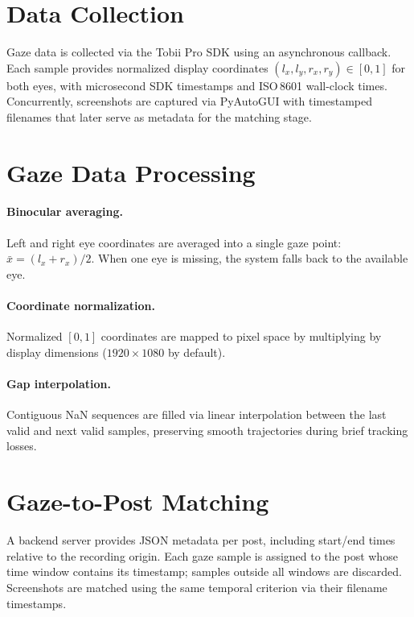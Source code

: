 \documentclass[11pt,a4paper]{article}
\begin{document}
\section{Data Collection}
\label{sec:collection}

Gaze data is collected via the Tobii Pro SDK using an asynchronous
callback. Each sample provides normalized display coordinates
$(l_x, l_y, r_x, r_y) \in [0,1]$ for both eyes, with microsecond SDK
timestamps and ISO\,8601 wall-clock times. Concurrently, screenshots are
captured via PyAutoGUI with timestamped filenames that later serve as
metadata for the matching stage.

\section{Gaze Data Processing}
\label{sec:processing}

\paragraph{Binocular averaging.}
Left and right eye coordinates are averaged into a single gaze point:
$\bar{x} = (l_x + r_x)/2$. When one eye is missing, the system falls
back to the available eye.

\paragraph{Coordinate normalization.}
Normalized $[0,1]$ coordinates are mapped to pixel space by multiplying
by display dimensions ($1920 \times 1080$ by default).

\paragraph{Gap interpolation.}
Contiguous NaN sequences are filled via linear interpolation between
the last valid and next valid samples, preserving smooth trajectories
during brief tracking losses.

\section{Gaze-to-Post Matching}
\label{sec:matching}

A backend server provides JSON metadata per post, including start/end
times relative to the recording origin. Each gaze sample is assigned to
the post whose time window contains its timestamp; samples outside all
windows are discarded. Screenshots are matched using the same temporal
criterion via their filename timestamps.
\end{document}
